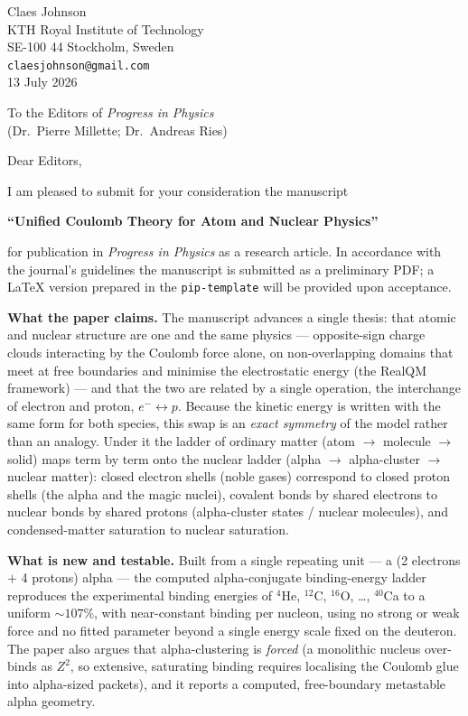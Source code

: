 \documentclass[11pt]{article}
\begin{document}
\noindent
Claes Johnson\\
KTH Royal Institute of Technology\\
SE-100 44 Stockholm, Sweden\\
\texttt{claesjohnson@gmail.com}\\[6pt]
13 July 2026

\bigskip
\noindent
To the Editors of \emph{Progress in Physics}\\
(Dr.\ Pierre Millette; Dr.\ Andreas Ries)

\bigskip
\noindent Dear Editors,

\medskip
I am pleased to submit for your consideration the manuscript

\medskip
\noindent\textbf{``Unified Coulomb Theory for Atom and Nuclear Physics''}

\medskip
\noindent for publication in \emph{Progress in Physics} as a research article. In accordance with the
journal's guidelines the manuscript is submitted as a preliminary PDF; a \LaTeX{} version prepared in
the \texttt{pip-template} will be provided upon acceptance.

\medskip
\textbf{What the paper claims.} The manuscript advances a single thesis: that atomic and nuclear
structure are one and the same physics --- opposite-sign charge clouds interacting by the Coulomb force
alone, on non-overlapping domains that meet at free boundaries and minimise the electrostatic energy
(the RealQM framework) --- and that the two are related by a single operation, the interchange of
electron and proton, $e^-\leftrightarrow p$. Because the kinetic energy is written with the same form
for both species, this swap is an \emph{exact symmetry} of the model rather than an analogy. Under it
the ladder of ordinary matter (atom $\to$ molecule $\to$ solid) maps term by term onto the nuclear
ladder (alpha $\to$ alpha-cluster $\to$ nuclear matter): closed electron shells (noble gases)
correspond to closed proton shells (the alpha and the magic nuclei), covalent bonds by shared
electrons to nuclear bonds by shared protons (alpha-cluster states / nuclear molecules), and
condensed-matter saturation to nuclear saturation.

\medskip
\textbf{What is new and testable.} Built from a single repeating unit --- a (2 electrons $+$ 4 protons)
alpha --- the computed alpha-conjugate binding-energy ladder reproduces the experimental binding
energies of $^4$He, $^{12}$C, $^{16}$O, \dots, $^{40}$Ca to a uniform ${\sim}107\%$, with
near-constant binding per nucleon, using no strong or weak force and no fitted parameter beyond a
single energy scale fixed on the deuteron. The paper also argues that alpha-clustering is
\emph{forced} (a monolithic nucleus over-binds as $Z^2$, so extensive, saturating binding requires
localising the Coulomb glue into alpha-sized packets), and it reports a computed, free-boundary
metastable alpha geometry.
\end{document}

